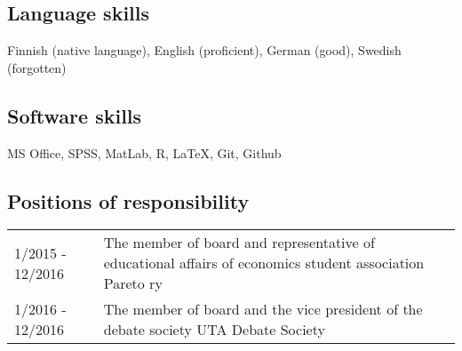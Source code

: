 \documentclass[16pt]{article}
\begin{document}
\subsection*{Language skills}
Finnish (native language), English (proficient), German (good), Swedish (forgotten)

\subsection*{Software skills}
MS Office, SPSS, MatLab, R, \LaTeX, Git, Github

\subsection*{Positions of responsibility}
\begin{tabular}{@{}p{1.5in}p{5in}}
1/2015 - 12/2016 & The member of board and representative of educational affairs of economics student association Pareto ry\\
1/2016 - 12/2016 & The member of board and the vice president of the debate society UTA Debate Society\\
\end{tabular}
\end{document}
